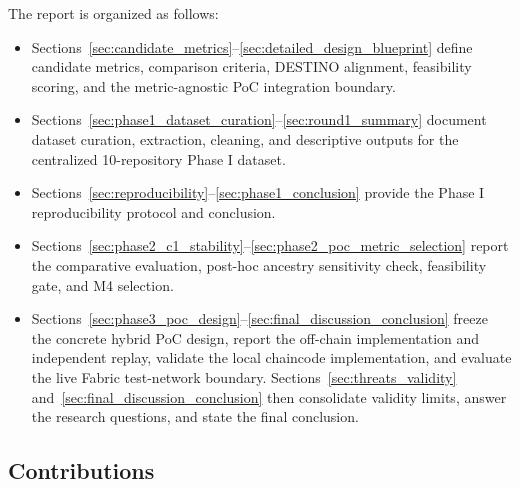 The report is organized as follows:
\begin{itemize}[leftmargin=*]
  \item Sections~\ref{sec:candidate_metrics}--\ref{sec:detailed_design_blueprint} define candidate metrics, comparison criteria, DESTINO alignment, feasibility scoring, and the metric-agnostic PoC integration boundary.
  \item Sections~\ref{sec:phase1_dataset_curation}--\ref{sec:round1_summary} document dataset curation, extraction, cleaning, and descriptive outputs for the centralized 10-repository Phase I dataset.
  \item Sections~\ref{sec:reproducibility}--\ref{sec:phase1_conclusion} provide the Phase I reproducibility protocol and conclusion.
  \item Sections~\ref{sec:phase2_c1_stability}--\ref{sec:phase2_poc_metric_selection} report the comparative evaluation,
  post-hoc ancestry sensitivity check, feasibility gate, and M4 selection.
  \item Sections~\ref{sec:phase3_poc_design}--\ref{sec:final_discussion_conclusion} freeze the concrete hybrid PoC design,
  report the off-chain implementation and independent replay, validate the local chaincode implementation, and evaluate the live
  Fabric test-network boundary. Sections~\ref{sec:threats_validity} and~\ref{sec:final_discussion_conclusion} then consolidate
  validity limits, answer the research questions, and state the final conclusion.
\end{itemize}

\subsection*{Contributions}

